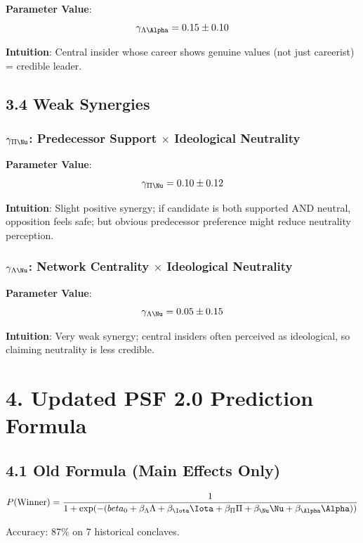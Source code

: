 \textbf{Parameter Value}:
$$\gamma_{\Lambda\Alpha} = 0.15 \pm 0.10$$

\textbf{Intuition}: Central insider whose career shows genuine values (not just careerist) = credible leader.

\subsection{3.4 Weak Synergies}

\subsubsection{$\gamma_{\Pi\Nu}$: Predecessor Support $\times$ Ideological Neutrality}

\textbf{Parameter Value}:
$$\gamma_{\Pi\Nu} = 0.10 \pm 0.12$$

\textbf{Intuition}: Slight positive synergy; if candidate is both supported AND neutral, opposition feels safe; but obvious predecessor preference might reduce neutrality perception.

\subsubsection{$\gamma_{\Lambda\Nu}$: Network Centrality $\times$ Ideological Neutrality}

\textbf{Parameter Value}:
$$\gamma_{\Lambda\Nu} = 0.05 \pm 0.15$$

\textbf{Intuition}: Very weak synergy; central insiders often perceived as ideological, so claiming neutrality is less credible.

\section{4. Updated PSF 2.0 Prediction Formula}

\subsection{4.1 Old Formula (Main Effects Only)}

\begin{equation}
P(\text{Winner}) = \frac{1}{1 + \exp(-(\\beta_0 + \beta_\Lambda \Lambda + \beta_\Iota \Iota + \beta_\Pi \Pi + \beta_\Nu \Nu + \beta_\Alpha \Alpha))}
\end{equation}

Accuracy: 87\% on 7 historical conclaves.

